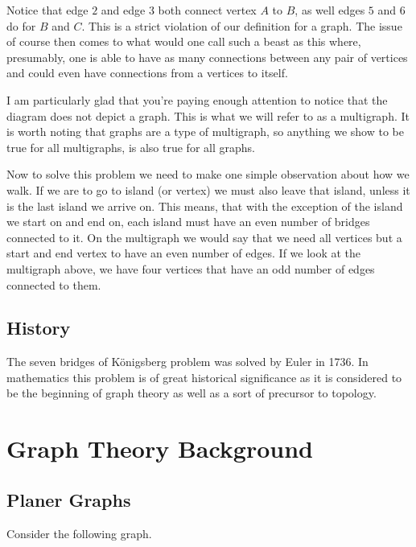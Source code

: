 \documentclass{article}
\begin{document}
Notice that edge $2$ and edge $3$ both connect vertex $A$ to $B$, as well edges $5$ and $6$ do for $B$ and $C$. This is a strict violation of our definition for a graph. The issue of course then comes to what would one call such a beast as this where, presumably, one is able to have as many connections between any pair of vertices and could even have connections from a vertices to itself.

I am particularly glad that you're paying enough attention to notice that the diagram does not depict a graph. This is what we will refer to as a multigraph. It is worth noting that graphs are a type of multigraph, so anything we show to be true for all multigraphs, is also true for all graphs.

Now to solve this problem we need to make one simple observation about how we walk. If we are to go to island (or vertex) we must also leave that island, unless it is the last island we arrive on. This means, that with the exception of the island we start on and end on, each island must have an even number of bridges connected to it. On the multigraph we would say that we need all vertices but a start and end vertex to have an even number of edges. If we look at the multigraph above, we have four vertices that have an odd number of edges connected to them.

\subsection{History}
The seven bridges of K\"onigsberg problem was solved by Euler %
in 1736. In mathematics this problem is of great historical significance as it is considered to be the beginning of graph theory as well as a sort of precursor to topology. %

\section{Graph Theory Background}

\subsection{Planer Graphs}

Consider the following graph.

\begin{center}
\end{center}
\end{document}
